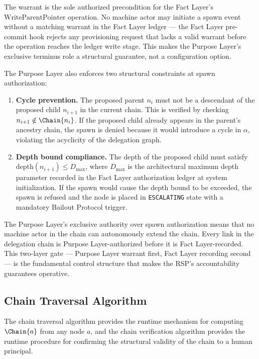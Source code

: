 The warrant is the sole authorized precondition for the Fact Layer's $\mathrm{WriteParentPointer}$ operation. No machine actor may initiate a spawn event without a matching warrant in the Fact Layer ledger — the Fact Layer pre-commit hook rejects any provisioning request that lacks a valid warrant before the operation reaches the ledger write stage. This makes the Purpose Layer's exclusive terminus role a structural guarantee, not a configuration option.

The Purpose Layer also enforces two structural constraints at spawn authorization:

\begin{enumerate}
    \item[(C1)] \textbf{Cycle prevention.} The proposed parent $n_i$ must not be a descendant of the proposed child $n_{i+1}$ in the current chain. This is verified by checking $n_{i+1} \notin \Chain{n_i}$. If the proposed child already appears in the parent's ancestry chain, the spawn is denied because it would introduce a cycle in $\alpha$, violating the acyclicity of the delegation graph.
    \item[(C2)] \textbf{Depth bound compliance.} The depth of the proposed child must satisfy $\mathrm{depth}(n_{i+1}) \leq D_{\max}$, where $D_{\max}$ is the architectural maximum depth parameter recorded in the Fact Layer authorization ledger at system initialization. If the spawn would cause the depth bound to be exceeded, the spawn is refused and the node is placed in \texttt{ESCALATING} state with a mandatory Bailout Protocol trigger.
\end{enumerate}

The Purpose Layer's exclusive authority over spawn authorization means that no machine actor in the chain can autonomously extend the chain. Every link in the delegation chain is Purpose Layer-authorized before it is Fact Layer-recorded. This two-layer gate — Purpose Layer warrant first, Fact Layer recording second — is the fundamental control structure that makes the RSP's accountability guarantees operative.

\subsection{Chain Traversal Algorithm}
\label{sec:chain-traversal}

The chain traversal algorithm provides the runtime mechanism for computing $\Chain{a}$ from any node $a$, and the chain verification algorithm provides the runtime procedure for confirming the structural validity of the chain to a human principal.


